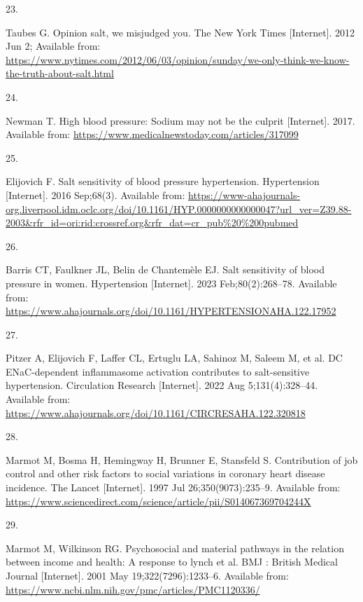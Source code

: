 \documentclass[
]{article}
\newlength{\cslhangindent}
\newlength{\csllabelwidth}
\newlength{\cslentryspacingunit} %
\newenvironment{CSLReferences}[2] %
 {%
  \setlength{\parindent}{0pt}
  \ifodd #1
  \let\oldpar\par
  \def\par{\hangindent=\cslhangindent\oldpar}
  \fi
  \setlength{\parskip}{#2\cslentryspacingunit}
 }%
 {}
\newcommand{\CSLLeftMargin}[1]{\parbox[t]{\csllabelwidth}{#1}}
\newcommand{\CSLRightInline}[1]{\parbox[t]{\linewidth - \csllabelwidth}{#1}\break}
\begin{document}
\begin{CSLReferences}{0}{0}
\leavevmode{}%
\CSLLeftMargin{23. }%
\CSLRightInline{Taubes G. Opinion \textbar{} salt, we misjudged you. The
New York Times {[}Internet{]}. 2012 Jun 2; Available from:
\url{https://www.nytimes.com/2012/06/03/opinion/sunday/we-only-think-we-know-the-truth-about-salt.html}}

\leavevmode{}%
\CSLLeftMargin{24. }%
\CSLRightInline{Newman T. High blood pressure: Sodium may not be the
culprit {[}Internet{]}. 2017. Available from:
\url{https://www.medicalnewstoday.com/articles/317099}}

\leavevmode{}%
\CSLLeftMargin{25. }%
\CSLRightInline{Elijovich F. Salt sensitivity of blood pressure
\textbar{} hypertension. Hypertension {[}Internet{]}. 2016 Sep;68(3).
Available from:
\url{https://www-ahajournals-org.liverpool.idm.oclc.org/doi/10.1161/HYP.0000000000000047?url_ver=Z39.88-2003\&rfr_id=ori:rid:crossref.org\&rfr_dat=cr_pub\%20\%200pubmed}}

\leavevmode{}%
\CSLLeftMargin{26. }%
\CSLRightInline{Barris CT, Faulkner JL, Belin de Chantemèle EJ. Salt
sensitivity of blood pressure in women. Hypertension {[}Internet{]}.
2023 Feb;80(2):268--78. Available from:
\url{https://www.ahajournals.org/doi/10.1161/HYPERTENSIONAHA.122.17952}}

\leavevmode{}%
\CSLLeftMargin{27. }%
\CSLRightInline{Pitzer A, Elijovich F, Laffer CL, Ertuglu LA, Sahinoz M,
Saleem M, et al. DC ENaC-dependent inflammasome activation contributes
to salt-sensitive hypertension. Circulation Research {[}Internet{]}.
2022 Aug 5;131(4):328--44. Available from:
\url{https://www.ahajournals.org/doi/10.1161/CIRCRESAHA.122.320818}}

\leavevmode{}%
\CSLLeftMargin{28. }%
\CSLRightInline{Marmot M, Bosma H, Hemingway H, Brunner E, Stansfeld S.
Contribution of job control and other risk factors to social variations
in coronary heart disease incidence. The Lancet {[}Internet{]}. 1997 Jul
26;350(9073):235--9. Available from:
\url{https://www.sciencedirect.com/science/article/pii/S014067369704244X}}

\leavevmode{}%
\CSLLeftMargin{29. }%
\CSLRightInline{Marmot M, Wilkinson RG. Psychosocial and material
pathways in the relation between income and health: A response to lynch
et al. BMJ : British Medical Journal {[}Internet{]}. 2001 May
19;322(7296):1233--6. Available from:
\url{https://www.ncbi.nlm.nih.gov/pmc/articles/PMC1120336/}}


\end{CSLReferences}
\end{document}
